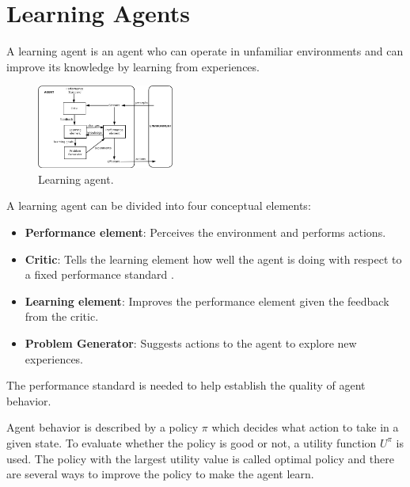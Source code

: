 \section{Learning Agents}
A learning agent is an agent who can operate in unfamiliar environments and can improve its knowledge by learning from experiences.

\begin{figure}[ht]
    \centering
    \includegraphics[width=0.4\textwidth]{images/IntelligentAgent-Learning.png}
    \caption{Learning agent.}
\end{figure}

\noindent
A learning agent can be divided into four conceptual elements:
\begin{itemize}
    \item \textbf{Performance element}: Perceives the environment and performs actions.
    \item \textbf{Critic}: Tells the learning element how well the agent is doing with respect to a fixed performance standard \cite{russell2002artificial}.
    \item \textbf{Learning element}: Improves the performance element given the feedback from the critic.
    \item \textbf{Problem Generator}: Suggests actions to the agent to explore new experiences.
\end{itemize}
The performance standard is needed to help establish the quality of agent behavior.

\vspace*{4mm}
\noindent
Agent behavior is described by a policy $\pi$ which decides what action to take in a given state.
To evaluate whether the policy is good or not, a utility function $U^{\pi}$ is used.
The policy with the largest utility value is called optimal policy and there are several ways to improve the policy to make the agent learn.
